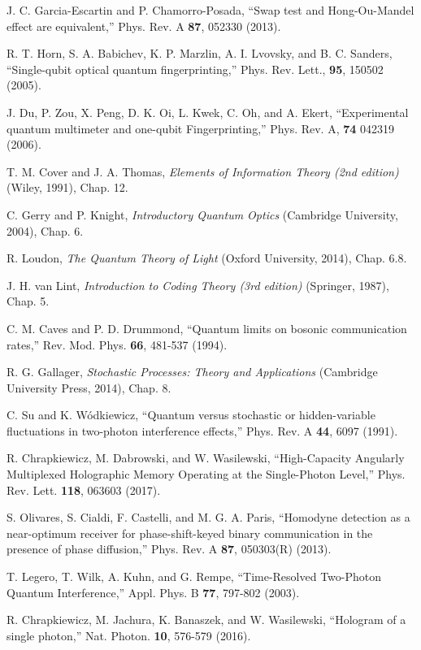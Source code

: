 \documentclass[10pt]{article}
\begin{document}
\begin{thebibliography}{99}
 J. C. Garcia-Escartin and P. Chamorro-Posada, ``Swap test and Hong-Ou-Mandel
effect are equivalent,'' Phys. Rev. A {\bf 87}, 052330 (2013).


 R. T. Horn, S. A. Babichev, K. P. Marzlin, A. I. Lvovsky, and B. C. Sanders,
``Single-qubit optical quantum fingerprinting,'' Phys. Rev. Lett., {\bf 95}, 150502 (2005).


 J. Du, P. Zou, X. Peng, D. K. Oi, L. Kwek, C. Oh, and A. Ekert, ``Experimental
quantum multimeter and one-qubit Fingerprinting,'' Phys. Rev. A, {\bf 74} 042319 (2006).

 T. M. Cover and J. A. Thomas, \textit{Elements of Information Theory (2nd edition)} (Wiley, 1991), Chap. 12.

 C. Gerry and P. Knight, \textit{Introductory Quantum Optics} (Cambridge University, 2004), Chap. 6.

 R. Loudon, \textit{The Quantum Theory of Light} (Oxford University, 2014), Chap. 6.8.

 J. H. van Lint, \textit{Introduction to Coding Theory (3rd edition)} (Springer, 1987), Chap. 5.

 C. M. Caves and P. D. Drummond, ``Quantum limits on bosonic communication rates,'' Rev. Mod. Phys. {\bf 66}, 481-537 (1994).

 R. G. Gallager, \textit{Stochastic Processes: Theory and Applications} (Cambridge University Press, 2014), Chap. 8.

 C. Su and K. W\'{o}dkiewicz, ``Quantum versus stochastic or hidden-variable fluctuations in two-photon interference effects,'' Phys. Rev. A {\bf 44}, 6097 (1991).

 R. Chrapkiewicz, M. Dabrowski, and W. Wasilewski, ``High-Capacity Angularly Multiplexed Holographic Memory Operating at the Single-Photon Level,'' Phys. Rev. Lett. {\bf 118}, 063603 (2017).

 S. Olivares, S. Cialdi, F. Castelli, and M. G. A. Paris, ``Homodyne detection as a near-optimum receiver for phase-shift-keyed binary communication in the presence of phase diffusion,'' Phys. Rev. A  {\bf 87}, 050303(R) (2013).

 T. Legero, T. Wilk, A. Kuhn, and G. Rempe, ``Time-Resolved Two-Photon Quantum Interference,'' Appl. Phys. B {\bf 77}, 797-802 (2003).

 R. Chrapkiewicz, M. Jachura, K. Banaszek, and W. Wasilewski, ``Hologram of a single photon,'' Nat. Photon. {\bf 10}, 576-579 (2016).


\end{thebibliography}
\end{document}
